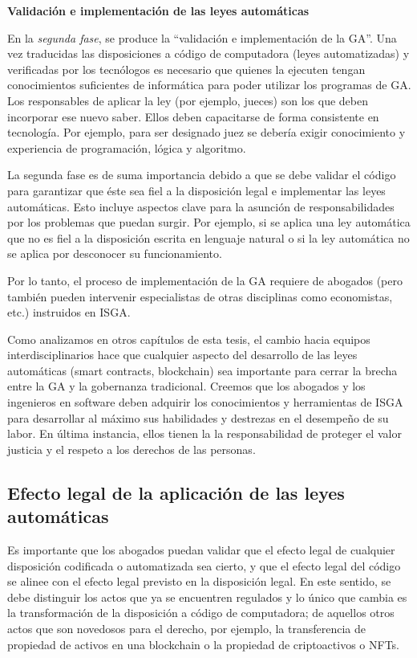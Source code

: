 \documentclass[12pt]{report} %
\begin{document}
\textbf{Validación e implementación de las leyes automáticas}

En la \textit{segunda fase}, se produce la “validación e implementación de la GA”. Una vez traducidas las disposiciones a código de computadora (leyes automatizadas) y verificadas por los tecnólogos es necesario que quienes la ejecuten tengan conocimientos suficientes de informática para poder utilizar los programas de GA. Los responsables de aplicar la ley (por ejemplo, jueces) son los que deben incorporar ese nuevo saber. Ellos deben capacitarse de forma consistente en tecnología. Por ejemplo, para ser designado juez se debería exigir conocimiento y experiencia de programación, lógica y algoritmo.

La segunda fase es de suma importancia debido a que se debe validar el código para garantizar que éste sea fiel a la disposición legal e implementar las leyes automáticas. Esto incluye aspectos clave para la asunción de responsabilidades por los problemas que puedan surgir. Por ejemplo, si se aplica una ley automática que no es fiel a la disposición escrita en lenguaje natural o si la ley automática no se aplica por desconocer su funcionamiento. 

Por lo tanto, el proceso de implementación de la GA requiere de abogados (pero también pueden intervenir especialistas de otras disciplinas como economistas, etc.) instruidos en ISGA. 

Como analizamos en otros capítulos de esta tesis, el cambio hacia equipos interdisciplinarios hace que cualquier aspecto del desarrollo de las leyes automáticas (smart contracts, blockchain) sea importante para cerrar la brecha entre la GA y la gobernanza tradicional. Creemos que los abogados y los ingenieros en software deben adquirir los conocimientos y herramientas de ISGA para desarrollar al máximo sus habilidades y destrezas en el desempeño de su labor. En última instancia, ellos tienen la la responsabilidad de proteger el valor justicia y el respeto a los derechos de las personas.  

\subsection{Efecto legal de la aplicación de las leyes automáticas}

Es importante que los abogados puedan validar que el efecto legal de cualquier disposición codificada o automatizada sea cierto, y que el efecto legal del código se alinee con el efecto legal previsto en la disposición legal. En este sentido, se debe distinguir los actos que ya se encuentren regulados y lo único que cambia es la transformación de la disposición a código de computadora; de aquellos otros actos que son novedosos para el derecho, por ejemplo, la transferencia de propiedad de activos en una blockchain o la propiedad de criptoactivos o NFTs. 
\end{document}
